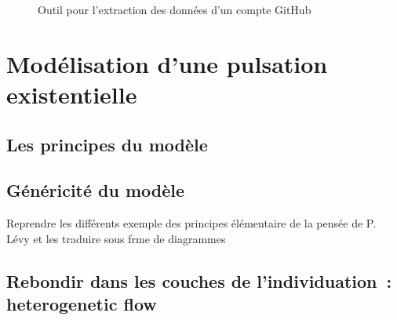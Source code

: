 \documentclass[
  a4paper,
  DIV=11,
  numbers=noendperiod]{scrreprt}
\begin{document}
\begin{figure}


\caption{\label{fig-outilsExtractGithub}Outil pour l'extraction des
données d'un compte GitHub}

\end{figure}%

\section{Modélisation d'une pulsation
existentielle}\label{moduxe9lisation-dune-pulsation-existentielle}

\subsection{Les principes du modèle}\label{les-principes-du-moduxe8le}

\subsection{Généricité du
modèle}\label{guxe9nuxe9ricituxe9-du-moduxe8le}

Reprendre les différents exemple des principes élémentaire de la pensée
de P. Lévy et les traduire sous frme de diagrammes

\subsection{Rebondir dans les couches de l'individuation~: heterogenetic
flow}\label{rebondir-dans-les-couches-de-lindividuation-heterogenetic-flow}
\end{document}
